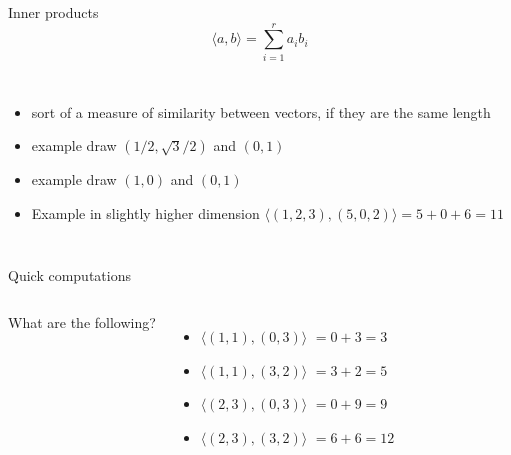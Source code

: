 \documentclass[aspectratio=169,usenames,dvipsnames]{beamer}
\newcommand{\InstructorNotes}[1]{\textit{\color{orange}#1}}
\newcommand{\InstructorList}[1]{
\begin{itemize}
	\color{orange}
	#1
\end{itemize}
}
\begin{document}
\begin{frame}[t]{Inner products}
\begin{equation*}
	\langle a,b \rangle = \sum_{i=1}^r a_ib_i
\end{equation*}
\begin{columns}
\centering

\InstructorList{
\item sort of a measure of similarity between vectors, if they are the same length
\item example draw $(1/2,\sqrt{3}/2)$ and $(0,1)$
\item example draw $(1,0)$ and $(0,1)$
\item Example in slightly higher dimension $\langle (1,2,3), (5,0,2)\rangle= 5 + 0 + 6 = 11 $

}

\centering


\end{columns}

\end{frame}


{
\begin{frame}[t]{Quick computations}
\begin{columns}
\centering
What are the following? 
\begin{itemize}
	\item $\langle (1,1), (0,3) \rangle$ 
	\InstructorNotes{$=0+3=3$}
	\item $\langle (1,1), (3,2) \rangle$
	\InstructorNotes{$=3+2=5$}
	\item $\langle (2,3), (0,3) \rangle$
	\InstructorNotes{$=0+9=9$}
	\item $\langle (2,3), (3,2) \rangle$
	\InstructorNotes{$=6+6=12$}
\end{itemize}
\centering
\end{columns}
\end{frame}
}
\end{document}

